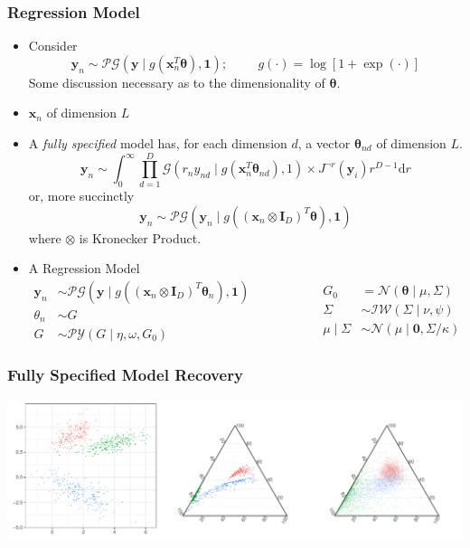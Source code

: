 \documentclass[aspectratio=169,10pt]{beamer}
\begin{document}
\begin{frame}
    \frametitle{Regression Model}
    {\footnotesize 
    \begin{itemize}
        \item Consider
        \[
            \bm{y}_n \sim \mathcal{PG}(\bm{y}\mid g(\bm{x}_n^T\bm{\theta}), \bm{1});
            \hspace{1cm}
            g(\cdot) = \log[1 + \exp(\cdot)]
        \]
        Some discussion necessary as to the dimensionality of $\bm{\theta}$.
        \item $\bm{x}_n$ of dimension $L$
        \item A \emph{fully specified} model has, for each dimension $d$, a vector $\bm{\theta}_{nd}$ of dimension $L$.
        \[
        \bm{y}_n \sim \int_0^{\infty}
            \prod_{d = 1}^D \mathcal{G}\left(r_ny_{nd}\mid 
                g(\bm{x}_n^T\bm{\theta}_{nd}), 1\right) \times J^{\neg r}(\bm{y}_i) r^{D-1}\text{d}r 
        \]
        or, more succinctly
        \[
        \bm{y}_n \sim \mathcal{PG}\left(\bm{y}_n \mid g((\bm{x}_n 
            \otimes \bm{I}_{D})^T\bm{\theta}), \bm{1}\right)
        \]
        where $\otimes$ is Kronecker Product.
        \item A Regression Model
        \[
        \begin{aligned}
            \bm{y}_n &\sim \mathcal{PG}\left(\bm{y}\mid 
                g\left((\bm{x}_n\otimes\bm{I}_D)^T\bm{\theta}_n\right), \bm{1}\right)\\
            \theta_n &\sim G\\
            G &\sim \mathcal{PY}(G\mid\eta, \omega, G_0)
        \end{aligned}
        ~\hspace{2cm}
        \begin{aligned}
            G_0 &= \mathcal{N}(\bm{\theta} \mid \mu, \Sigma)\\
            \Sigma &\sim \mathcal{IW}(\Sigma\mid \nu, \psi)\\
            \mu\mid\Sigma &\sim \mathcal{N}(\mu\mid \bm{0}, \Sigma / \kappa)
        \end{aligned}
        \]
    \end{itemize}
    }
\end{frame} %

\begin{frame}
    \frametitle{Fully Specified Model Recovery}
    \begin{center}
    \includegraphics[width = \textwidth]{./ch3/plots/simulated_reg}
    \end{center}
\end{frame} %
\end{document}
